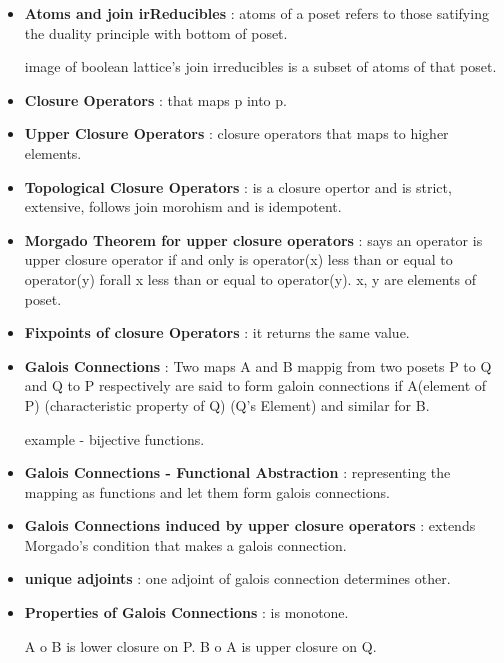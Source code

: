 \begin{itemize}
	\item{\textbf{Atoms and join irReducibles} : atoms of a poset refers to those satifying the duality principle with bottom of poset.

	image of boolean lattice's join irreducibles is a subset of atoms of that poset.
	}

	\item{\textbf{Closure Operators} : that maps p into p.
	}
	
	\item{\textbf{Upper Closure Operators} : closure operators that maps to higher elements.
	}

	\item{\textbf{Topological Closure Operators} : is a closure opertor and is strict, extensive, follows join morohism and is idempotent.
	}

	\item{\textbf{Morgado Theorem for upper closure operators} : says an operator is upper closure operator if and only is operator(x) less than or equal to operator(y) forall x less than or equal to operator(y). x, y are elements of poset.
	}

	\item{\textbf{Fixpoints of closure Operators} : it returns the same value.
	}
	
	\item{\textbf{Galois Connections} : Two maps A and B mappig from two posets P to Q and Q to P respectively are said to form galoin connections if A(element of P) (characteristic property of Q) (Q's Element) and similar for B.

	example - bijective functions.

	}

	\item{\textbf{Galois Connections - Functional Abstraction} : representing the mapping as functions and let them form galois connections.
	}

	\item{\textbf{Galois Connections induced by upper closure operators} : extends Morgado's condition that makes a galois connection.
	}

	\item{\textbf{unique adjoints} : one adjoint of galois connection determines other.
	}
	
	\item{\textbf{Properties of Galois Connections} : 
	is monotone.

	A o B is lower closure on P.
	B o A is upper closure on Q.

}
\end{itemize}
